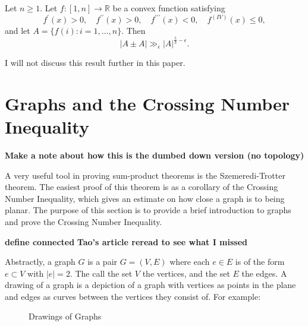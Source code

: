 \documentclass[12pt]{amsart}
\begin{document}
\begin{theorem}
    Let \(n \geq 1\). Let \(f: [1,n]\to \mathbb{R} \) be a convex function satisfying
    \[
    f^{\prime}(x)>0, \quad f^{\prime \prime}(x)>0, \quad f^{\prime \prime \prime}(x)<0, \quad f^{(I V)}(x) \leq 0,
    \]
    and let \(A=\{f(i): i=1, \ldots, n\}\). Then
    \[
        \left\lvert A \pm A \right\rvert \gg_{\epsilon} \left\lvert A \right\rvert ^{\frac{5}{3} - \epsilon}
    .\]
\end{theorem}

I will not discuss this result further in this paper.

\section{Graphs and the Crossing Number Inequality}

\textbf{Make a note about how this is the dumbed down version (no topology)}

A very useful tool in proving sum-product theorems is the Szemeredi-Trotter theorem. The
easiest proof of this theorem is as a corollary of the Crossing Number Inequality, which gives
an estimate on how close a graph is to being planar. The purpose of this section
is to provide a brief introduction to graphs and prove the Crossing Number Inequality.

\textbf{define connected}
\textbf{Tao's article reread to see what I missed}

Abstractly, a graph \(G\) is a pair \(G = (V,E)\) where each \(e \in E\) is of the form \(e \subset V\) with \(\left\lvert e \right\rvert = 2\).
The call the set \(V\) the vertices, and the set \(E\) the edges. A drawing of a graph
is a depiction of a graph with vertices as points in the plane and edges as curves between the
vertices they consist of. For example:

\begin{figure}[h]
    \centering
    \qquad
    \caption{Drawings of Graphs}
\end{figure}
\end{document}
